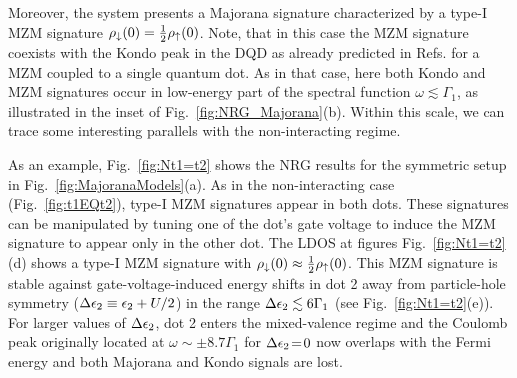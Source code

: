 \documentclass[showpacs,aps,prb,reprint,superscriptaddress]{revtex4-2}
\begin{document}
Moreover, the system presents a Majorana signature characterized by a type-I MZM signature $\rho_\downarrow(0) = \frac{1}{2}\rho_\uparrow(0)$. Note, that in this case the MZM signature coexists with the Kondo peak in the DQD as already predicted in Refs. \cite{lee_kondo_2013,ruiz-tijerina_interaction_2015} for a MZM coupled to a single quantum dot. As in that case, here both Kondo and MZM signatures occur in low-energy part of the spectral function $\omega \lesssim \Gamma_1$, as illustrated in the inset of Fig.\ \ref{fig:NRG_Majorana}(b). Within this scale, we can trace some interesting parallels with the non-interacting regime. 

As an example, Fig.\ \ref{fig:Nt1=t2} shows the NRG results for the symmetric setup in Fig.\ \ref{fig:MajoranaModels}(a). As in the non-interacting case (Fig.\ \ref{fig:t1EQt2}), type-I MZM  signatures appear in both dots.  These signatures can be manipulated by tuning one of the dot's gate voltage to induce the MZM signature to appear only in the other dot. The LDOS at figures Fig.\ \ref{fig:Nt1=t2}(d) shows a type-I MZM  signature with $\rho_\downarrow(0) \approx \frac{1}{2}\rho_\uparrow(0)$. This MZM signature is stable against gate-voltage-induced energy shifts in dot 2 away from particle-hole symmetry ($\Delta \epsilon_2 \equiv \epsilon_2+U/2$) in the range $\Delta \epsilon_2 \lesssim 6\Gamma_1$ (see Fig.\ \ref{fig:Nt1=t2}(e)). For larger values of $\Delta \epsilon_2$, dot 2 enters the mixed-valence regime and the Coulomb peak originally located at $\omega \sim \pm 8.7 \Gamma_1$ for $\Delta \epsilon_2\!=\!0$ now overlaps with the Fermi energy and both Majorana and Kondo signals are lost.

  
\end{document}
